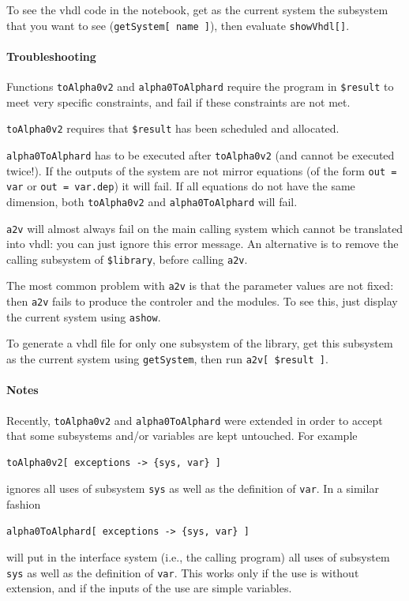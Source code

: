 \documentclass[12pt]{article}
\newcommand{\vhdl}{{\sc vhdl}}
\begin{document}
To see the \vhdl{} code in the notebook, get as the current system
the subsystem that you want to see (\texttt{getSystem[ name ]}), 
then evaluate \texttt{showVhdl[]}.

\paragraph*{Troubleshooting}
Functions \texttt{toAlpha0v2} and \texttt{alpha0ToAlphard} require
the program in \texttt{\$result} to meet very specific constraints, and fail 
if these constraints are not met. 

\texttt{toAlpha0v2} requires that \texttt{\$result} has been scheduled and 
allocated. 

\texttt{alpha0ToAlphard} has to be executed after 
\texttt{toAlpha0v2} (and cannot be executed twice!). If
the outputs of the system are not mirror equations (of the
form \texttt{out = var} or \texttt{out = var.dep}) it will
fail. If all equations do not have the same dimension, both
\texttt{toAlpha0v2} and \texttt{alpha0ToAlphard} will fail.

\texttt{a2v} will almost always fail on the main calling
system which cannot be translated into \vhdl{}: you can 
just ignore this error message. An alternative is to remove
the calling subsystem of \texttt{\$library}, before calling \texttt{a2v}.

The most common problem with \texttt{a2v} is that the parameter
values are not fixed: then \texttt{a2v} fails to 
produce the controler and the modules. 
To see this, just display the current system using \texttt{ashow}.

To generate a \vhdl{} file for only one subsystem of the 
library, get this subsystem as the current system using 
\texttt{getSystem}, then run \texttt{a2v[ \$result ]}. 

\paragraph*{Notes}
Recently, \texttt{toAlpha0v2} and \texttt{alpha0ToAlphard}
were extended in order to accept that some subsystems and/or
variables are kept untouched. For example
\begin{verbatim}
toAlpha0v2[ exceptions -> {sys, var} ]
\end{verbatim}
ignores all uses of subsystem \texttt{sys} as well as
the definition of \texttt{var}. 
In a similar fashion
\begin{verbatim}
alpha0ToAlphard[ exceptions -> {sys, var} ]
\end{verbatim}
will put in the interface system (i.e., the calling program)
all uses of subsystem \texttt{sys} as well as
the definition of \texttt{var}. This works only if the 
use is without extension, and if the inputs of the 
use are simple variables. 
\end{document}

